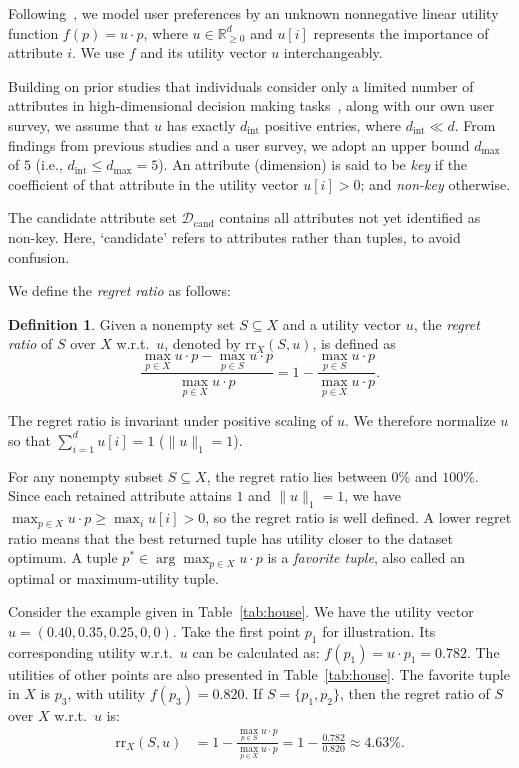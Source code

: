 \documentclass[conference]{IEEEtran}
\theoremstyle{definition}
\newtheorem{definition}[theorem]{Definition}
\theoremstyle{plain}
\begin{document}
Following~\cite{CB00, LC09, NL12, NS10, PW14}, we model user preferences by an unknown nonnegative linear utility function $f(p)=u\cdot p$, where $u\in\mathbb{R}_{\geq0}^{d}$ and $u[i]$ represents the importance of attribute $i$. We use $f$ and its utility vector $u$ interchangeably.

Building on prior studies that individuals consider only a limited number of attributes in high-dimensional decision making tasks~\cite{GG96, GA12, WX22, SC05, TK03, DMW12}, along with our own user survey, we assume that $u$ has exactly $d_\text{int}$ positive entries, where $d_\text{int}\ll d$. From findings from previous studies and a user survey, we adopt an upper bound $d_\text{max}$ of $5$ (i.e., $d_\text{int}\leq d_\text{max}=5$). An attribute (dimension) is said to be \textit{key} if the coefficient of that attribute in the utility vector $u[i]>0$; and \textit{non-key} otherwise.

The candidate attribute set $\mathcal{D}_\text{cand}$ contains all attributes not yet identified as non-key. Here, `candidate' refers to attributes rather than tuples, to avoid confusion.

We define the \textit{regret ratio}\cite{NS10} as follows:

\begin{definition}\cite{NS10}
Given a nonempty set $S \subseteq X$ and a utility vector $u$, the \emph{regret ratio} of $S$ over $X$ w.r.t.\ $u$, denoted by $\mathrm{rr}_X(S, u)$, is defined as
\[
\frac{\max_{p \in X} u \cdot p - \max_{p \in S} u \cdot p}{\max_{p \in X} u \cdot p}
= 1 - \frac{\max_{p \in S} u \cdot p}{\max_{p \in X} u \cdot p}.
\]
\end{definition}

The regret ratio is invariant under positive scaling of $u$. We therefore normalize $u$ so that $\sum_{i=1}^{d}u[i]=1$ ($\lVert u\rVert_1=1$).

For any nonempty subset $S\subseteq X$, the regret ratio lies between $0\%$ and $100\%$. Since each retained attribute attains $1$ and $\lVert u\rVert_1=1$, we have $\max_{p\in X}u\cdot p\geq\max_i u[i]>0$, so the regret ratio is well defined. A lower regret ratio means that the best returned tuple has utility closer to the dataset optimum. A tuple $p^*\in\arg\max_{p\in X}u\cdot p$ is a \textit{favorite tuple}, also called an optimal or maximum-utility tuple.

Consider the example given in Table~\ref{tab:house}. We have the utility vector $u = (0.40, 0.35, 0.25, 0, 0)$. Take the first point $p_1$ for illustration. Its corresponding utility w.r.t.\ $u$ can be calculated as: $f(p_1) = u \cdot p_1 = 0.782$. The utilities of other points are also presented in Table~\ref{tab:house}. The favorite tuple in $X$ is $p_3$, with utility $f(p_3) = 0.820$. If $S = \{p_1, p_2\}$, then the regret ratio of $S$ over $X$ w.r.t.\ $u$ is:
\[
\begin{aligned}
\mathrm{rr}_X(S, u) &= 1 - \frac{\max_{p \in S} u \cdot p}{\max_{p \in X} u \cdot p} = 1-\frac{0.782}{0.820} \approx 4.63\%.
\end{aligned}
\]
\end{document}
